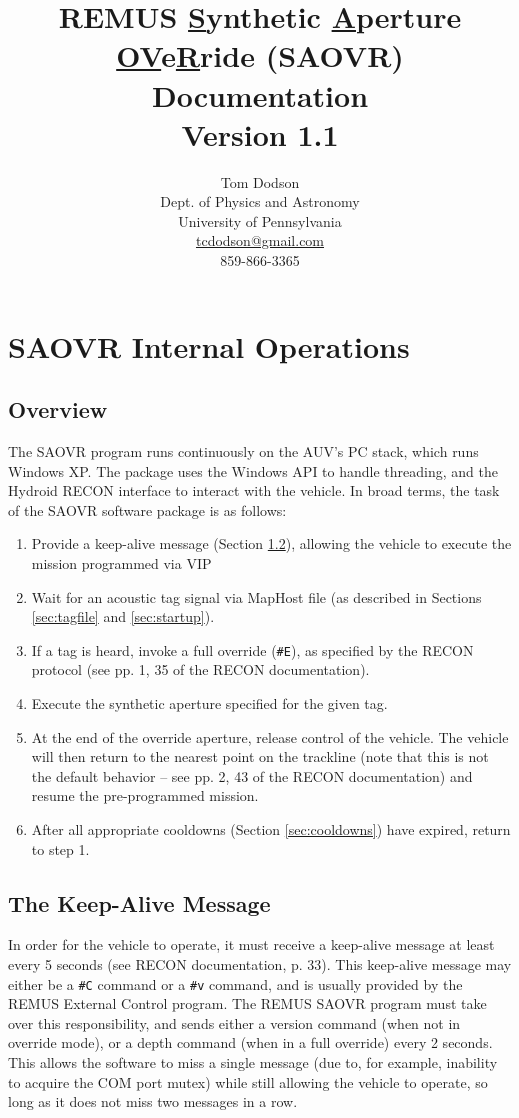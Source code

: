 \documentclass[11pt]{article} %
\title{REMUS \underline{S}ynthetic \underline{A}perture \underline{OV}e\underline{R}ride (SAOVR) Documentation \\ Version 1.1}
\author{Tom Dodson \\ Dept. of Physics and Astronomy \\ University of Pennsylvania \\ \href{tcdodson@gmail.com}{tcdodson@gmail.com}
 \\ 859-866-3365}
\date{} %
\begin{document}
\maketitle

\section{SAOVR Internal Operations}
\subsection{Overview}
The SAOVR program runs continuously on the AUV's PC stack, which runs Windows XP. The package uses the Windows API to handle threading, and the Hydroid RECON interface to interact with the vehicle.
In broad terms, the task of the SAOVR software package is as follows:

\begin{enumerate}
\item Provide a keep-alive message (Section \ref{sec:keepalive}), allowing the vehicle to execute the mission programmed via VIP
\item Wait for an acoustic tag signal via MapHost file (as described in Sections \ref{sec:tagfile} and \ref{sec:startup}).
\item If a tag is heard, invoke a full override (\texttt{\#E}), as specified by the RECON protocol (see pp. 1, 35 of the RECON documentation).
\item Execute the synthetic aperture specified for the given tag.
\item At the end of the override aperture, release control of the vehicle. The vehicle will then return to the nearest point on the trackline 
	(note that this is not the default behavior -- see pp. 2, 43 of the RECON documentation) and resume the pre-programmed mission.
\item After all appropriate cooldowns (Section \ref{sec:cooldowns}) have expired, return to step 1.
\end{enumerate}

\subsection{The Keep-Alive Message}
\label{sec:keepalive}
In order for the vehicle to operate, it must receive a keep-alive message at least every 5 seconds (see RECON documentation, p. 33). This keep-alive 
message may either be a \mbox{\texttt{\#C}} command or a \mbox{\texttt{\#v}} command, and is usually provided by the REMUS External Control 
program. The REMUS SAOVR program must take over this responsibility, and sends either a version command (when not in override mode), 
or a depth command (when in a full override) every 2 seconds.  This allows the software to miss a single message (due to, for example, inability to
acquire the COM port mutex) while still allowing the vehicle to operate, so long as it does not miss two messages in a row.
\end{document}
